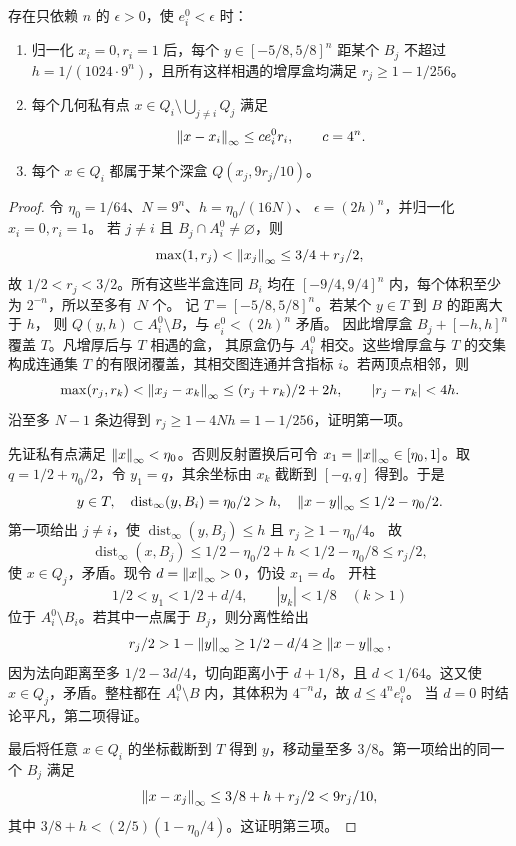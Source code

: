 \begin{lemma}[小空隙的局部定位]\label{lem:global-small-gap}
存在只依赖 \(n\) 的 \(\epsilon>0\)，使 \(e_i^0<\epsilon\) 时：
\begin{enumerate}
 \item 归一化 \(x_i=0,r_i=1\) 后，每个
 \(y\in[-5/8,5/8]^n\) 距某个 \(B_j\) 不超过
 \(h=1/(1024\cdot9^n)\)，且所有这样相遇的增厚盒均满足
 \(r_j\ge1-1/256\)。
 \item 每个几何私有点 \(x\in Q_i\setminus\bigcup_{j\ne i}Q_j\) 满足
 \begin{equation}\label{eq:global-private-localization}
  \left\lVert x-x_i\right\rVert_\infty\le c e_i^0r_i,\qquad c=4^n.
 \end{equation}
 \item 每个 \(x\in Q_i\) 都属于某个深盒 \(Q(x_j,9r_j/10)\)。
\end{enumerate}
\end{lemma}
\begin{proof}
令 \(\eta_0=1/64\)、\(N=9^n\)、\(h=\eta_0/(16N)\)、
\(\epsilon=(2h)^n\)，并归一化 \(x_i=0,r_i=1\)。
若 \(j\ne i\) 且 \(B_j\cap A_i^0\ne\varnothing\)，则
\[
 \max(1,r_j)<\left\lVert x_j\right\rVert_\infty\le3/4+r_j/2,
\]
故 \(1/2<r_j<3/2\)。所有这些半盒连同 \(B_i\) 均在
\([-9/4,9/4]^n\) 内，每个体积至少为 \(2^{-n}\)，所以至多有 \(N\) 个。
记 \(T=[-5/8,5/8]^n\)。若某个 \(y\in T\) 到 \(B\) 的距离大于 \(h\)，
则 \(Q(y,h)\subset A_i^0\setminus B\)，与 \(e_i^0<(2h)^n\) 矛盾。
因此增厚盒 \(B_j+[-h,h]^n\) 覆盖 \(T\)。凡增厚后与 \(T\) 相遇的盒，
其原盒仍与 \(A_i^0\) 相交。这些增厚盒与 \(T\) 的交集构成连通集
\(T\) 的有限闭覆盖，其相交图连通并含指标 \(i\)。若两顶点相邻，则
\[
 \max(r_j,r_k)<\left\lVert x_j-x_k\right\rVert_\infty
 \le(r_j+r_k)/2+2h,
 \qquad |r_j-r_k|<4h.
\]
沿至多 \(N-1\) 条边得到 \(r_j\ge1-4Nh=1-1/256\)，证明第一项。

先证私有点满足 \(\left\lVert x\right\rVert_\infty<\eta_0\)。否则反射置换后可令
\(x_1=\left\lVert x\right\rVert_\infty\in[\eta_0,1]\)。取 \(q=1/2+\eta_0/2\)，令
\(y_1=q\)，其余坐标由 \(x_k\) 截断到 \([-q,q]\) 得到。于是
\[
 y\in T,\quad \operatorname{dist}_\infty(y,B_i)=\eta_0/2>h,
 \quad\left\lVert x-y\right\rVert_\infty\le1/2-\eta_0/2.
\]
第一项给出 \(j\ne i\)，使
\(\operatorname{dist}_\infty(y,B_j)\le h\) 且 \(r_j\ge1-\eta_0/4\)。
故
\[
 \operatorname{dist}_\infty(x,B_j)
 \le1/2-\eta_0/2+h<1/2-\eta_0/8\le r_j/2,
\]
使 \(x\in Q_j\)，矛盾。现令 \(d=\left\lVert x\right\rVert_\infty>0\)，仍设 \(x_1=d\)。
开柱
\[
 1/2<y_1<1/2+d/4,\qquad |y_k|<1/8\quad(k>1)
\]
位于 \(A_i^0\setminus B_i\)。若其中一点属于 \(B_j\)，则分离性给出
\[
 r_j/2>1-\left\lVert y\right\rVert_\infty\ge1/2-d/4\ge\left\lVert x-y\right\rVert_\infty,
\]
因为法向距离至多 \(1/2-3d/4\)，切向距离小于 \(d+1/8\)，且
\(d<1/64\)。这又使 \(x\in Q_j\)，矛盾。整柱都在
\(A_i^0\setminus B\) 内，其体积为 \(4^{-n}d\)，故 \(d\le4^ne_i^0\)。
当 \(d=0\) 时结论平凡，第二项得证。

最后将任意 \(x\in Q_i\) 的坐标截断到 \(T\) 得到 \(y\)，移动量至多
\(3/8\)。第一项给出的同一个 \(B_j\) 满足
\[
 \left\lVert x-x_j\right\rVert_\infty\le3/8+h+r_j/2<9r_j/10,
\]
其中 \(3/8+h<(2/5)(1-\eta_0/4)\)。这证明第三项。
\end{proof}

